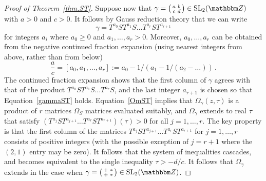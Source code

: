 \documentclass[12pt,reqno]{amsart}
\theoremstyle{definition}
\def\BZ{\mathbbm Z}
\def\SL{\mathrm{SL}}
\def\be{\begin{equation}}
\def\ee{\end{equation}}
\def\Om{\Omega}
\def\sma#1#2#3#4{\bigl(\smallmatrix#1&#2\\#3&#4\endsmallmatrix\bigr)} %
\begin{document}
\begin{proof}[Proof of Theorem~\ref{thm.ST}]
  Suppose now that $\gamma=\sma abcd \in \SL_2(\BZ)$ with $a>0$ and $c>0$.
  It follows by Gauss reduction theory that we can write
  \be
  \label{gammaST}
  \gamma = T^{a_0} S T^{a_1} S \dots T^{a_r} S T^{a_{r+1}}
  \ee
  for integers $a_i$ where $a_0 \geq 0$ and $a_1, \dots, a_r >0$. Moreover, 
  $a_0, \dots, a_r$ can be obtained from the negative continued fraction
  expansion (using nearest integers from above, rather than from below)
  \be
  \label{contfrac}
  \frac{a}{c} = [a_0,a_1,\dots,a_r]:= a_0 -1/(a_1 -1/(a_2 - \dots))\,.
  \ee
  The continued fraction expansion shows that the first column of $\gamma$
  agrees with that of the product $T^{a_0} S T^{a_1} S \dots T^{a_r} S$, and
  the last integer $a_{r+1}$ is chosen so that Equation~\eqref{gammaST} holds.
  Equation~\eqref{OmST} implies that $\Om_\gamma(z,\tau)$ is a product of $r$
  matrices $\Om_S$ matrices evaluated suitably, and $\Om_\gamma$ extends to
  real $\tau$ that satisfy $(T^{a_j} S T^{a_{j+1}} \dots T^{a_r} S T^{a_{r+1}})(\tau)>0$
  for all $j=1,\dots,r$. The key property is that the first
  column of the matrices $T^{a_j} S T^{a_{j+1}} \dots T^{a_r} S T^{a_{r+1}}$
  for $j=1,\dots,r$  consists of positive integers (with the possible exception
  of $j=r+1$ where the $(2,1)$ entry may be zero). It follows that the system
  of inequalities cascades, and becomes equivalent to the single inequality
  $\tau > -d/c$. It follows that $\Om_\gamma$ extends in the case when
  $\gamma=\sma +*+* \in \SL_2(\BZ)$. 


\end{proof}
\end{document}
